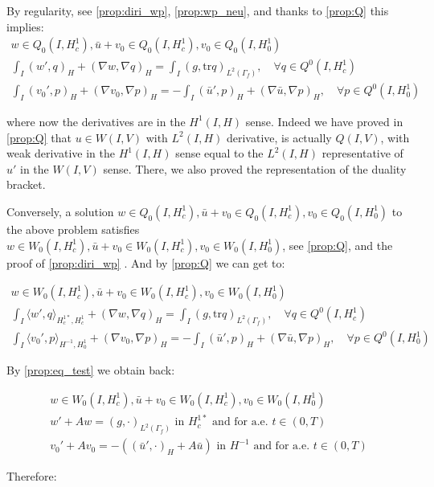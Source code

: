 \documentclass[english,a4paper,10pt,oneside]{scrbook}	%
\theoremstyle{break}
\theoremstyle{remark}
\newcommand{\tr}{\text{tr}}
\begin{document}
By regularity, see \cref{prop:diri_wp}, \cref{prop:wp_neu}, and thanks to \cref{prop:Q} this implies:
\begin{align*}
w \in Q_0(I, H^1_c), \bar{u}+v_0 \in Q_0(I,H^1_c), v_0 \in Q_0(I,H^1_0) \\
\int_I ( w' , q)_H+ (\nabla w, \nabla q)_H = \int_I(g,\tr q)_{L^2(\Gamma_f)}, \quad \forall q \in Q^0(I, H^1_c) \\
\int_I (v_0',p)_H + (\nabla v_0, \nabla p)_H= -\int_I(\bar{u}',p)_H+(\nabla \bar{u}, \nabla p)_H, \quad \forall p \in Q^0(I, H^1_0) 
\end{align*}

where now the derivatives are in the $H^1(I,H)$ sense. Indeed we have proved in \cref{prop:Q} that $u \in W(I,V)$ with $L^2(I,H)$ derivative, is actually $Q(I,V)$, with weak derivative in the $H^1(I,H)$ sense equal to the $L^2(I,H)$ representative of $u'$ in the $W(I,V)$ sense. There, we also proved the representation of the duality bracket.

Conversely, a solution $w \in Q_0(I, H^1_c), \bar{u}+v_0 \in Q_0(I,H^1_c), v_0 \in Q_0(I,H^1_0) $ to the above problem satisfies $w \in W_0(I, H^1_c), \bar{u}+v_0 \in W_0(I,H^1_c), v_0 \in W_0(I,H^1_0)$, see \cref{prop:Q}, and the proof of \cref{prop:diri_wp} . And by \cref{prop:Q} we can get to:

\begin{align*}
w \in W_0(I, H^1_c), \bar{u}+v_0 \in W_0(I,H^1_c), v_0 \in W_0(I,H^1_0) \\
\int_I \langle w' , q\rangle_{H^{1*}_c,H^1_c}+ (\nabla w, \nabla q)_H = \int_I(g,\tr q)_{L^2(\Gamma_f)}, \quad \forall q \in Q^0(I, H^1_c) \\
\int_I \langle v_0',p\rangle_{H^{-1},H^1_0} + (\nabla v_0, \nabla p)_H= -\int_I(\bar{u}',p)_H+(\nabla \bar{u}, \nabla p)_H, \quad \forall p \in Q^0(I, H^1_0) 
\end{align*}

By \cref{prop:eq_test} we obtain back:

\begin{align*}
w \in W_0(I, H^1_c),\bar{u}+v_0 \in W_0(I,H^1_c), v_0 \in W_0(I,H^1_0)\\
w' + A w = (g,\cdot)_{L^2(\Gamma_f)} \text{ in }H^{1*}_c \text{ and for a.e. } t \in (0,T) \\
v_0' + A v_0 = -((\bar{u}',\cdot)_H+A \bar{u}) \text{ in }H^{-1} \text{ and for a.e. } t \in (0,T) 
\end{align*}

Therefore:
\end{document}
